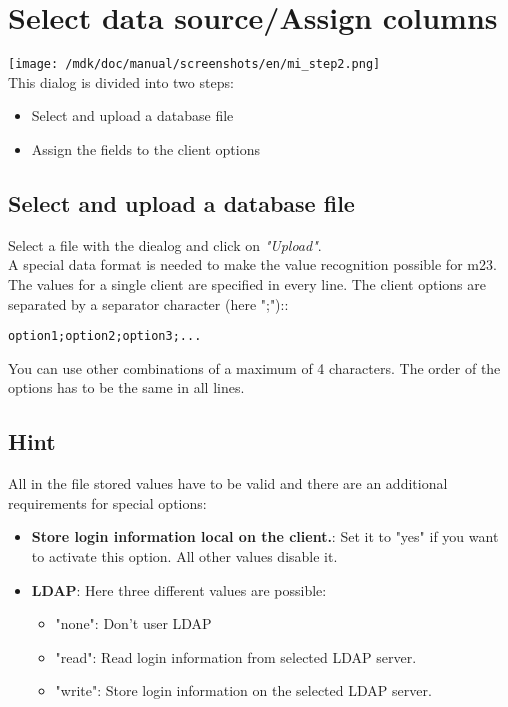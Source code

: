 \section{Select data source/Assign columns}
\texttt{[image: /mdk/doc/manual/screenshots/en/mi\_step2.png]} \\
This dialog is divided into two steps:\\
\begin{itemize}
\item Select and upload a database file\\
\item Assign the fields to the client options\\
\end{itemize}
\subsection{Select and upload a database file}
Select a file with the diealog and click on \textit{"Upload"}.\\
A special data format is needed to make the value recognition possible for m23. The values for a single client are specified in every line. The client options are separated by a separator character (here ";")::\\
\begin{verbatim}
option1;option2;option3;...
\end{verbatim}
You can use other combinations of a maximum of 4 characters. The order of the options has to be the same in all lines.\\
\subsection{Hint}
All in the file stored values have to be valid and there are an additional requirements for special options:\\
\begin{itemize}
\item \textbf{Store login information local on the client.}: Set it to "yes" if you want to activate this option. All other values disable it.\\
\item \textbf{LDAP}: Here three different values are possible:\\
\begin{itemize}
\item "none": Don't user LDAP\\
\item "read": Read login information from selected LDAP server.\\
\item "write": Store login information on the selected LDAP server.\\
\end{itemize}
\end{itemize}
